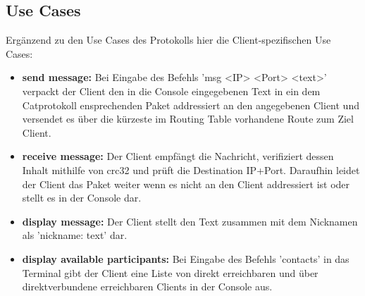 \subsection{Use Cases}

Ergänzend zu den Use Cases des Protokolls hier die Client-spezifischen Use Cases:

\begin{itemize}
\item \textbf{send message:} Bei Eingabe des Befehls 'msg <IP> <Port> <text>' verpackt der Client den in die Console eingegebenen Text in ein dem Catprotokoll ensprechenden Paket addressiert an den angegebenen Client und versendet es über die kürzeste im Routing Table vorhandene Route zum Ziel Client.  
\item \textbf{receive message:} Der Client empfängt die Nachricht, verifiziert dessen Inhalt mithilfe von crc32 und prüft die Destination IP+Port. Daraufhin leidet der Client das Paket weiter wenn es nicht an den Client addressiert ist oder stellt es in der Console dar.
\item \textbf{display message:} Der Client stellt den Text zusammen mit dem Nicknamen als 'nickname: text' dar.
\item \textbf{display available participants:} Bei Eingabe des Befehls 'contacts' in das Terminal gibt der Client eine Liste von direkt erreichbaren und über direktverbundene erreichbaren Clients in der Console aus.
\end{itemize}